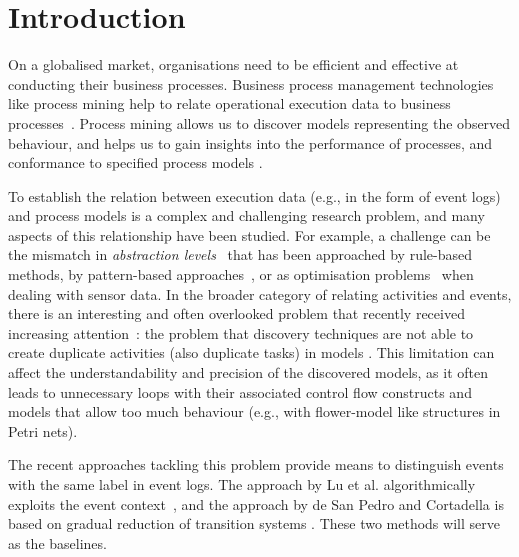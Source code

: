 \section{Introduction}
\label{sec:intro}
On a globalised market, organisations need to be efficient and effective at conducting their business processes. Business process management technologies like process mining help to relate operational execution data to business processes~\cite{DBLP:books/daglib/0031128}. Process mining allows us to discover models representing the observed behaviour, and helps us to gain insights into the performance of processes, and conformance to specified process models \cite{DBLP:books/sp/Aalst16}.

To establish the relation between execution data (e.g., in the form of event logs) and process models is a complex and challenging research problem, and many aspects of this relationship have been studied. For example, a challenge can be the mismatch in \emph{abstraction levels}~\cite{DBLP:journals/is/0001MW14} that has been approached by rule-based methods, by pattern-based approaches~\cite{DBLP:conf/bpm/MannhardtLRAT16}, or as optimisation problems~\cite{DBLP:conf/caise/SenderovichRGMM16} when dealing with sensor data. 
In the broader category of relating activities and events, there is an interesting and often overlooked problem that recently received increasing attention~\cite{DBLP:conf/bpm/LuFBA16,DBLP:conf/bpm/PedroC16}: the problem that discovery techniques are not able to create duplicate activities (also duplicate tasks) in models \cite{DBLP:journals/topnoc/Carmona12}. This limitation can affect the understandability and precision of the discovered models, as it often leads to unnecessary loops with their associated control flow constructs and models that allow too much behaviour (e.g., with flower-model like structures in Petri nets).

The recent approaches tackling this problem provide means to distinguish events with the same label in event logs. The approach by Lu et al. algorithmically exploits the event context~\cite{DBLP:conf/bpm/LuFBA16}, and the approach by de San Pedro and Cortadella is based on gradual reduction of transition systems \cite{DBLP:conf/bpm/PedroC16}. These two methods will serve as the baselines.


